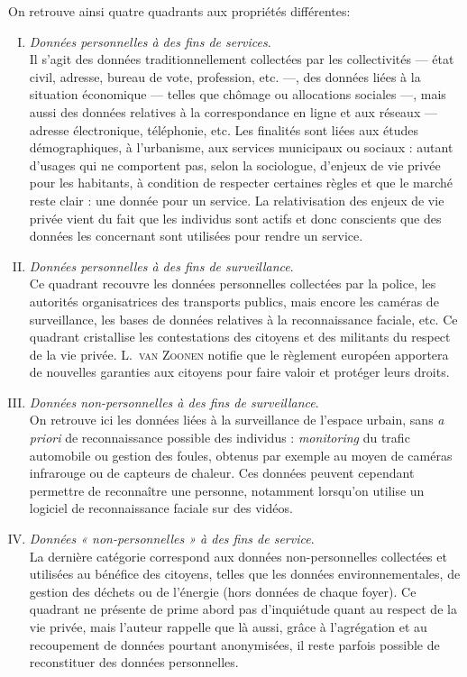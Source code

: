On retrouve ainsi quatre quadrants aux propriétés différentes:
\begin{enumerate}[I.]
\item \textit{Données personnelles à des fins de services}.\\
Il s’agit des données traditionnellement collectées par les collectivités --- état civil, adresse, bureau de vote, profession, etc. ---, des données liées à la situation économique --- telles que chômage ou allocations sociales ---, mais aussi des données relatives à la correspondance en ligne et aux réseaux --- adresse électronique, téléphonie, etc. Les finalités sont liées aux études démographiques, à l’urbanisme, aux services municipaux ou sociaux : autant d’usages qui ne comportent pas, selon la sociologue, d’enjeux de vie privée pour les habitants, à condition de respecter certaines règles et que le marché reste clair : une donnée pour un service. La relativisation des enjeux de vie privée vient du fait que les individus sont actifs et donc conscients que des données les concernant sont utilisées pour rendre un service.
\item \textit{Données personnelles à des fins de surveillance}.\\
Ce quadrant recouvre les données personnelles collectées par la police, les autorités organisatrices des transports publics, mais encore les caméras de surveillance, les bases de données relatives à la reconnaissance faciale, etc. Ce quadrant cristallise les contestations des citoyens et des militants du respect de la vie privée. L.~\textsc{van Zoonen} 
notifie que le règlement européen apportera de nouvelles garanties aux citoyens pour faire valoir et protéger leurs droits.
\item \textit{Données non-personnelles à des fins de surveillance}.\\
On retrouve ici les données liées à la surveillance de l’espace urbain, sans \textit{a priori} de reconnaissance possible des individus : \textit{monitoring} du trafic automobile ou gestion des foules, obtenus par exemple au moyen de caméras infrarouge ou de capteurs de chaleur. Ces données peuvent cependant permettre de reconnaître une personne, notamment lorsqu’on utilise un logiciel de reconnaissance faciale sur des vidéos.
\item \textit{Données « non-personnelles » à des fins de service}.\\
La dernière catégorie correspond aux données non-personnelles collectées et utilisées au bénéfice des citoyens, telles que les données environnementales, de gestion des déchets ou de l’énergie (hors données de chaque foyer). Ce quadrant ne présente de prime abord pas d’inquiétude quant au respect de la vie privée, mais l’auteur rappelle que là aussi, grâce à l’agrégation et au recoupement de données pourtant anonymisées, il reste parfois possible de reconstituer des données personnelles.
\end{enumerate}

